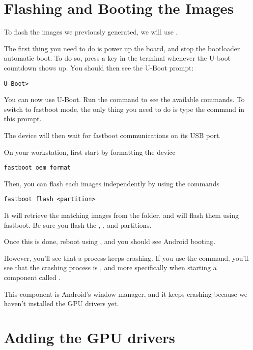 \section{Flashing and Booting the Images}

To flash the images we previously generated, we will use
.

The first thing you need to do is power up the board, and stop the
bootloader automatic boot. To do so, press a key in the 
terminal whenever the U-boot countdown shows up. You should then see
the U-Boot prompt:
\begin{verbatim}
U-Boot>
\end{verbatim}

You can now use U-Boot. Run the  command to see the
available commands. To switch to fastboot mode, the only thing you
need to do is type the command  in this prompt.

The device will then wait for fastboot communications on its USB port.

On your workstation, first start by formatting the device

\begin{verbatim}
fastboot oem format
\end{verbatim}

Then, you can flash each images independently by using the commands

\begin{verbatim}
fastboot flash <partition>
\end{verbatim}

It will retrieve the matching images from the  folder, and
will flash them using fastboot. Be sure you flash the ,
,  and  partitions.

Once this is done, reboot using , and you should
see Android booting.

However, you'll see that a process keeps crashing. If you use the
 command, you'll see that the crashing process is
, and more specifically when starting a component called
.

This component is Android's window manager, and it keeps crashing
because we haven't installed the GPU drivers yet.

\section{Adding the GPU drivers}

